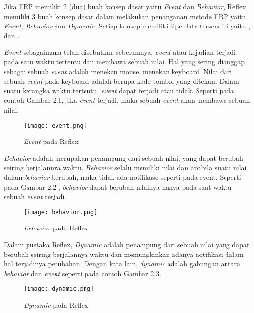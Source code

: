 \documentclass[pi.tex]{subfile}
\begin{document}
\hspace{5pt}Jika FRP memiliki 2 (dua) buah konsep dasar yaitu \emph{Event} dan \emph{Behavior}, Reflex memiliki 3 buah konsep dasar dalam melakukan penanganan metode FRP yaitu \emph{Event}, \emph{Behavior} dan \emph{Dynamic}. Setiap konsep memiliki tipe data tersendiri yaitu ,  dan .

\hspace{5pt}\emph{Event} sebagaimana telah disebutkan sebelumnya, \emph{event} atau kejadian terjadi pada satu waktu tertentu dan  membawa sebuah nilai. Hal yang sering dianggap sebagai sebuah \emph{event} adalah menekan mouse, menekan keyboard. Nilai dari sebuah \emph{event} pada keyboard adalah berupa kode tombol yang ditekan. Dalam suatu kerangka waktu tertentu, \emph{event} dapat terjadi atau tidak. Seperti pada contoh Gambar 2.1, jika \emph{event} terjadi, maka sebuah \emph{event} akan membawa sebuah nilai.

\begin{figure}[H]
  \texttt{[image: event.png]}

  \caption[Event pada Reflex]{\emph{Event} pada Reflex}
  \centering
\end{figure}

\hspace{5pt}\emph{Behavior} adalah merupakan penampung dari sebuah nilai, yang dapat berubah seiring berjalannya waktu. \emph{Behavior} selalu memiliki nilai dan apabila suatu nilai dalam \emph{behavior} berubah, maka tidak ada notifikase seperti pada event. Seperti pada Gambar 2.2 , \emph{behavior} dapat berubah nilainya hanya pada saat waktu sebuah \emph{event} terjadi.

\begin{figure}[H]
  \texttt{[image: behavior.png]}

  \caption[Behavior pada Reflex]{\emph{Behavior} pada Reflex}
  \centering
\end{figure}


\hspace{5pt}Dalam pustaka Reflex, \emph{Dynamic} adalah penampung dari sebuah nilai yang dapat berubah seiring berjalannya waktu dan memungkinkan adanya notifikasi dalam hal terjadinya perubahan. Dengan kata lain, \emph{dynamic} adalah gabungan antara \emph{behavior} dan \emph{event} seperti pada contoh Gambar 2.3.


\begin{figure}[H]
  \texttt{[image: dynamic.png]}
  
  \caption[Dynamic pada Reflex]{\emph{Dynamic} pada Reflex}
  \centering
\end{figure}
\end{document}
